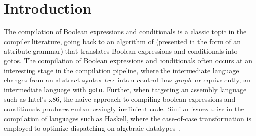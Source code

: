 \documentclass[sigplan,review,dvipsnames,screen,10pt]{acmart}
\begin{document}



\maketitle

\section{Introduction}

The compilation of Boolean expressions and conditionals is a classic
topic in the compiler literature, going back to an algorithm of
\citet{Aho:1986qf} (presented in the form of an attribute grammar)
that translates Boolean expressions and conditionals into gotos. The
compilation of Boolean expressions and conditionals often occurs at an
interesting stage in the compilation pipeline, where the intermediate
language changes from an abstract syntax \emph{tree} into a control
flow \emph{graph}, or equivalently, an intermediate language with
\texttt{goto}. Further, when targeting an assembly language such as
Intel's x86, the naive approach to compiling boolean expressions and
conditionals produces embarrassingly inefficient code. Similar issues
arise in the compilation of languages such as Haskell, where the
case-of-case transformation is employed to optimize dispatching on
algebraic datatypes~\citep{PEYTONJONES19983}.
\end{document}
